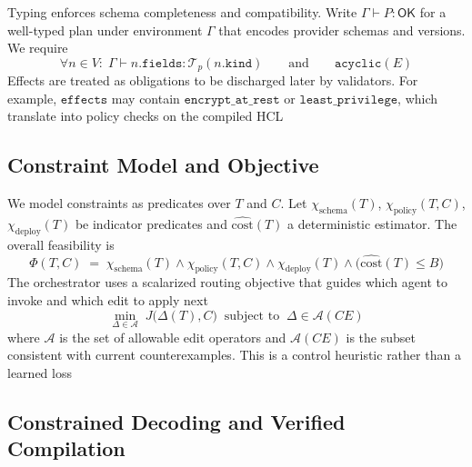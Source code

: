 \documentclass[acmsmall,screen,review,anonymous]{acmart}
\begin{document}
Typing enforces schema completeness and compatibility. Write $\Gamma \vdash P : \mathsf{OK}$ for a well-typed plan under environment $\Gamma$ that encodes provider schemas and versions. We require
\begin{equation}
\forall n \in V:\; \Gamma \vdash n.\texttt{fields} : \mathcal{T}_p(n.\texttt{kind}) \qquad \text{and} \qquad \mathtt{acyclic}(E)
\end{equation}
Effects are treated as obligations to be discharged later by validators. For example, $\texttt{effects}$ may contain $\mathtt{encrypt\_at\_rest}$ or $\mathtt{least\_privilege}$, which translate into policy checks on the compiled HCL

\subsection{Constraint Model and Objective}
\label{sec:constraints}

We model constraints as predicates over $T$ and $C$. Let $\chi_{\text{schema}}(T)$, $\chi_{\text{policy}}(T,C)$, $\chi_{\text{deploy}}(T)$ be indicator predicates and $\widehat{\mathrm{cost}}(T)$ a deterministic estimator. The overall feasibility is
\begin{equation}
\Phi(T,C) \;=\; \chi_{\text{schema}}(T) \wedge \chi_{\text{policy}}(T,C) \wedge \chi_{\text{deploy}}(T) \wedge \big( \widehat{\mathrm{cost}}(T) \le B \big)
\end{equation}
The orchestrator uses a scalarized routing objective that guides which agent to invoke and which edit to apply next
\begin{equation}
\label{eq:objective}
\min_{\Delta \in \mathcal{A}} \; J\big( \Delta(T), C \big) \;\;\text{subject to}\;\; \Delta \in \mathcal{A}(CE)
\end{equation}
where $\mathcal{A}$ is the set of allowable edit operators and $\mathcal{A}(CE)$ is the subset consistent with current counterexamples. This is a control heuristic rather than a learned loss

\subsection{Constrained Decoding and Verified Compilation}
\label{sec:decoding}
\end{document}

